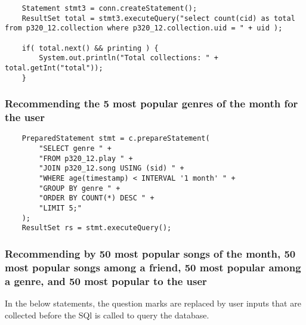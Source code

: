\documentclass[12pt]{article}
\begin{document}
    \begin{lstlisting}
    Statement stmt3 = conn.createStatement();
    ResultSet total = stmt3.executeQuery("select count(cid) as total from p320_12.collection where p320_12.collection.uid = " + uid );

    if( total.next() && printing ) {
        System.out.println("Total collections: " + total.getInt("total"));
    }
    \end{lstlisting}

   \subsubsection{Recommending the 5 most popular genres of the month for the user}

    \begin{lstlisting}
    PreparedStatement stmt = c.prepareStatement(
        "SELECT genre " +
        "FROM p320_12.play " +
        "JOIN p320_12.song USING (sid) " +
        "WHERE age(timestamp) < INTERVAL '1 month' " +
        "GROUP BY genre " +
        "ORDER BY COUNT(*) DESC " +
        "LIMIT 5;"
    );
    ResultSet rs = stmt.executeQuery();
    \end{lstlisting}


    \subsubsection{Recommending by 50 most popular songs of the month, 50 most popular songs among a friend, 50 most popular among a genre, and 50 most popular to the user}

    \vspace{0.5cm}
    In the below statements, the question marks are replaced by user inputs that are collected
    before the SQl is called to query the database.
\end{document}
